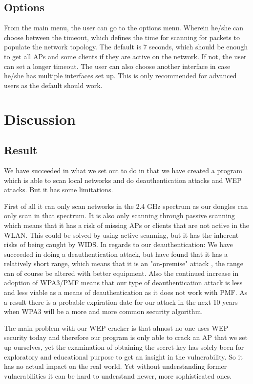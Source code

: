 \subsection{Options}
From the main menu, the user can go to the options menu. Wherein he/she can choose between the timeout, which defines the time for scanning for packets to populate the network topology. The default is 7 seconds, which should be enough to get all APs and some clients if they are active on the network. If not, the user can set a longer timeout. The user can also choose another interface in case he/she has multiple interfaces set up. This is only recommended for advanced users as the default should work.

\section{Discussion}
\subsection{Result}
We have succeeded in what we set out to do in that we have created a program which is able to scan local networks and do deauthentication attacks and WEP attacks. But it has some limitations. 

First of all it can only scan networks in the 2.4 GHz spectrum as our dongles can only scan in that spectrum. It is also only scanning through passive scanning which means that it has a risk of missing APs or clients that are not active in the WLAN. This could be solved by using active scanning, but it has the inherent risks of being caught by WIDS. In regards to our deauthentication: We have succeeded in doing a deauthentication attack, but have found that it has a relatively short range, which means that it is an "on-premise" attack , the range can of course be altered with better equipment. Also the continued increase in adoption of WPA3/PMF means that our type of deauthentication attack is less and less viable as a means of deauthentication as it does not work with PMF. As a result there is a probable expiration date for our attack in the next 10 years when WPA3 will be a more and more common security algorithm. 

The main problem with our WEP cracker is that almost no-one uses WEP security today and therefore our program is only able to crack an AP that we set up ourselves, yet the examination of obtaining the secret-key has solely been for exploratory and educational purpose to get an insight in the vulnerability. So it has no actual impact on the real world. Yet without understanding former vulnerabilities it can be hard to understand newer, more sophisticated ones.


